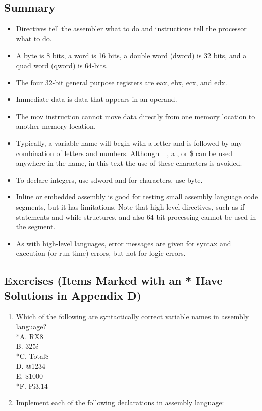 \documentclass[10pt]{article}
\begin{document}
\subsection*{Summary}
\begin{itemize}
  \item Directives tell the assembler what to do and instructions tell the processor what to do.
  \item A byte is 8 bits, a word is 16 bits, a double word (dword) is 32 bits, and a quad word (qword) is 64-bits.
  \item The four 32-bit general purpose registers are eax, ebx, ecx, and edx.
  \item Immediate data is data that appears in an operand.
  \item The mov instruction cannot move data directly from one memory location to another memory location.
  \item Typically, a variable name will begin with a letter and is followed by any combination of letters and numbers. Although \_, a , or $\$$ can be used anywhere in the name, in this text the use of these characters is avoided.
  \item To declare integers, use sdword and for characters, use byte.
  \item Inline or embedded assembly is good for testing small assembly language code segments, but it has limitations. Note that high-level directives, such as if statements and while structures, and also 64-bit processing cannot be used in the segment.
  \item As with high-level languages, error messages are given for syntax and execution (or run-time) errors, but not for logic errors.
\end{itemize}

\subsection*{Exercises (Items Marked with an * Have Solutions in Appendix D)}
\begin{enumerate}
  \item Which of the following are syntactically correct variable names in assembly language?\\
*A. RX8\\
B. $325 i$\\
*C. Total\$\\
D. @1234\\
E. $\$ 1000$\\
*F. Pi3.14
  \item Implement each of the following declarations in assembly language:
\end{enumerate}
\end{document}

